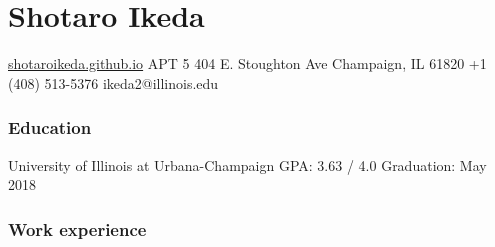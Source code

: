 \documentclass{tccv}
\begin{document}
\part{Shotaro Ikeda}

\personal
{\href{https://shotaroikeda.github.io/}{shotaroikeda.github.io}}
{APT 5 404 E. Stoughton Ave \newline
  Champaign, IL 61820}
{+1 (408) 513-5376}
{ikeda2@illinois.edu}

\section{Education}

\begin{yearlist}

  {University of Illinois at  \newline Urbana-Champaign}
  {GPA: 3.63 / 4.0}
  {Graduation: May 2018}

\end{yearlist}

\section{Work experience}
\end{document}
